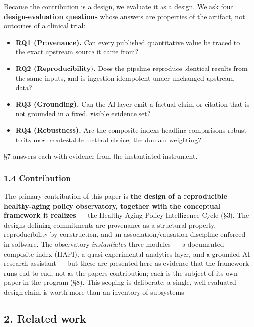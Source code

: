 \documentclass[
  11pt,
]{article}
\providecommand{\tightlist}{%
  \setlength{\itemsep}{0pt}\setlength{\parskip}{0pt}}
\begin{document}
Because the contribution is a design, we evaluate it as a design. We ask
four \textbf{design-evaluation questions} whose answers are properties
of the artifact, not outcomes of a clinical trial:

\begin{itemize}
\tightlist
\item
  \textbf{RQ1 (Provenance).} Can every published quantitative value be
  traced to the exact upstream source it came from?
\item
  \textbf{RQ2 (Reproducibility).} Does the pipeline reproduce identical
  results from the same inputs, and is ingestion idempotent under
  unchanged upstream data?
\item
  \textbf{RQ3 (Grounding).} Can the AI layer emit a factual claim or
  citation that is not grounded in a fixed, visible evidence set?
\item
  \textbf{RQ4 (Robustness).} Are the composite index\textquotesingle s
  headline comparisons robust to its most contestable method choice, the
  domain weighting?
\end{itemize}

§7 answers each with evidence from the instantiated instrument.

\hypertarget{14-contribution}{%
\subsubsection{1.4 Contribution}\label{14-contribution}}

The primary contribution of this paper is \textbf{the design of a
reproducible healthy-aging policy observatory, together with the
conceptual framework it realizes} --- the Healthy Aging Policy
Intelligence Cycle (§3). The design\textquotesingle s defining
commitments are provenance as a structural property, reproducibility by
construction, and an association/causation discipline enforced in
software. The observatory \emph{instantiates} three modules --- a
documented composite index (HAPI), a quasi-experimental analytics layer,
and a grounded AI research assistant --- but these are presented here as
evidence that the framework runs end-to-end, not as the
paper\textquotesingle s contribution; each is the subject of its own
paper in the program (§8). This scoping is deliberate: a single,
well-evaluated design claim is worth more than an inventory of
subsystems.

\hypertarget{2-related-work}{%
\subsection{2. Related work}\label{2-related-work}}
\end{document}
